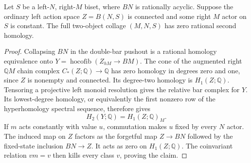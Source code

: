 \begin{lemma}
\label{CP2:A-connected-leaf-constant}
Let $S$ be a left-$N$, right-$M$ biset, where $BN$ is
rationally acyclic. Suppose the ordinary left action space
$Z=B(N,S)$ is connected and some right $M$ actor on $S$
is constant. The full two-object collage $(M,N,S)$ has
zero rational second homology.
\end{lemma}
\begin{proof}
Collapsing $BN$ in the double-bar pushout is a rational
homology equivalence onto
$Y=\operatorname{hocofib}(Z_{hM}\to BM)$.
The cone of the augmented right $\mathbb QM$ chain complex
$C_*(Z;\mathbb Q)\to\mathbb Q$ has zero homology in
degrees zero and one, since $Z$ is nonempty and connected.
Its degree-two homology is $H_1(Z;\mathbb Q)$.
Tensoring a projective left monoid resolution gives the
relative bar complex for $Y$. Its lowest-degree homology,
or equivalently the first nonzero row of the hyperhomology
spectral sequence, therefore gives
\[
 H_2(Y;\mathbb Q)=H_1(Z;\mathbb Q)_M.
\]
If $m$ acts constantly with value $u$, commutation makes
$u$ fixed by every $N$ actor. The induced map on $Z$
factors as the forgetful map $Z\to BN$ followed by the
fixed-state inclusion $BN\to Z$. It acts as zero on
$H_1(Z;\mathbb Q)$. The coinvariant relation $v m=v$
then kills every class $v$, proving the claim.
\end{proof}

